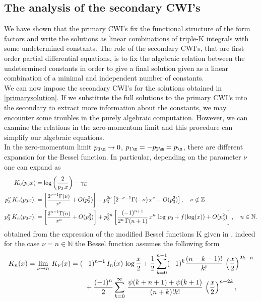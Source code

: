 \documentclass[a4paper,11pt,openright,twoside]{book}
\let\G=\Gamma  \let\D=\Delta \let\Q=\Theta  \let\L=\Lambda
\newcommand{\sdfrac}[2]{\mbox{\small$\displaystyle\frac{#1}{#2}$}}
\numberwithin{equation}{section}
\begin{document}
{{{\subsection{The analysis of the secondary CWI's}
We have shown that the primary CWI's fix the functional structure of the form factors and write the solutions as linear combinations of triple-K integrals with some undetermined constants. The role of the secondary CWI's, that are first order partial differential equations, is to fix the algebraic relation between the undetermined constants in order to give a final solution given as a linear combination of a minimal and independent number of constants.\\ 
We can now impose the secondary CWI's for the solutions obtained in \eqref{primarysolution}. If we substitute the full solutions to the primary CWI's into the secondary to extract more information about the constants, we may encounter some troubles in the purely algebraic computation. However, we can examine the relations in the zero-momentum limit and this procedure can simplify our algebraic equations.\\ 
In the zero-momentum limit $p_{3\m}\to0$, $p_{1\m}=-p_{2\m}=p_{\m}$, there are different expansion for the Bessel function. In particular, depending on the parameter $\nu$ one can expand as
\begin{align}
	\,K_{0}(p_3 x)&= \log\left(\frac{2}{p_3\,x}\right)-\gamma_E\\
	p_3^{\nu}\,K_{\nu}(p_3 x),&
	=\left[\sdfrac{2^{{\nu}-1}\G(\nu)}{x^{\nu}}+O(p_3^2)\right]+p_3^{2{\nu}}\left[2^{-{\nu}-1}\G(-{\nu})\,x^\nu+O(p_3^2)\right],\quad \nu\notin\mathbb{Z}\\
	p_3^{n}\,K_{n}(p_3 x),&
	=\left[\sdfrac{2^{{n}-1}\G(n)}{x^{n}}+O(p_3^2)\right]+p_3^{2{n}}\left[\frac{(-1)^{n+1}}{2^n\,\Gamma(n+1)}\,x^n\,\log\,p_3+f(\log(x))+O(p_3^2)\right],\quad n\in\mathbb{N}.
\end{align}
obtained from the expression of the modified Bessel functions K given in \cite{Prudnikov}, indeed for the case $\nu=n\in\mathbb{N}$ the Bessel function assumes the following form
\begin{align}
	K_{n}(x)=\lim_{\nu\to n}\,K_{\nu}(x)&=(-1)^{n+1}\,I_{n}(x)\,\log\frac{x}{2}+\frac{1}{2}\sum_{k=0}^{n-1}(-1)^k\frac{(n-k-1)!}{k!}\,\left(\frac{x}{2}\right)^{2k-n}\notag\\
	&\qquad +\frac{(-1)^n}{2}\sum_{k=0}^\infty\,\frac{\psi(k+n+1)+\psi(k+1)}{(n+k)!k!}\,\left(\frac{x}{2}\right)^{n+2k},
\end{align}
}}}
\end{document}
